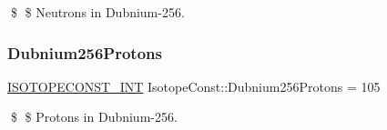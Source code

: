 \$ \$ Neutrons in Dubnium-\/256. \mbox{\label{group___isotope_const-_dubnium-_db256_ga8842b622a9b1c9545ab6525bbb2f37f9}} 
\subsubsection{\texorpdfstring{Dubnium256\+Protons}{Dubnium256Protons}}
{\footnotesize\ttfamily \mbox{\hyperlink{group___isotope_const-_macros_ga5f18360b3e99483a35c32d789e62621c}{I\+S\+O\+T\+O\+P\+E\+C\+O\+N\+S\+T\+\_\+\+I\+NT}} Isotope\+Const\+::\+Dubnium256\+Protons = 105}

\$ \$ Protons in Dubnium-\/256. 
